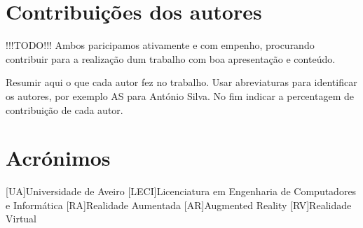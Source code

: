 \documentclass{report}
\begin{document}
\chapter*{Contribuições dos autores}
!!!TODO!!! Ambos paricipamos ativamente e com empenho, procurando contribuir para a realização dum trabalho com boa apresentação e conteúdo.

Resumir aqui o que cada autor fez no trabalho. Usar abreviaturas para identificar os autores, por exemplo AS para António Silva. No fim indicar a percentagem de contribuição de cada autor.

\chapter*{Acrónimos}
\begin{acronym}
[UA]{Universidade de Aveiro}
[LECI]{Licenciatura em Engenharia de Computadores e Informática}
[RA]{Realidade Aumentada}
[AR]{Augmented Reality}
[RV]{Realidade Virtual}
\end{acronym}

\printbibliography
\end{document}
